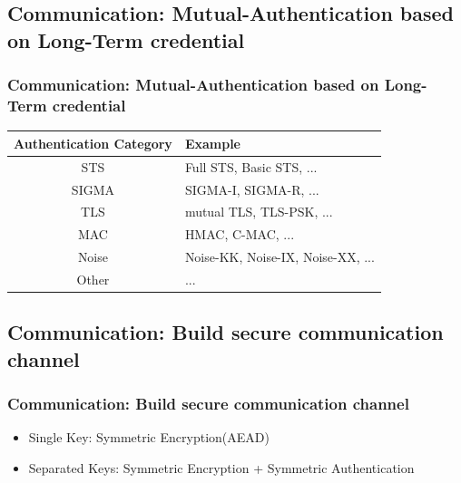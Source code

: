 \documentclass{ctexbeamer}
\begin{document}
\subsection{Communication: Mutual-Authentication based on Long-Term credential}
\begin{frame}
\frametitle{Communication: Mutual-Authentication based on Long-Term credential}


    \begin{table}[width=\textwidth]
        \begin{tabular}{ |c|l| } \hline
            \textbf{Authentication Category} & \textbf{Example} \\ \hline
            STS & Full STS, Basic STS, ... \\ \hline
            SIGMA & SIGMA-I, SIGMA-R, ... \\ \hline
            TLS &  mutual TLS, TLS-PSK, ... \\ \hline
            MAC & HMAC, C-MAC, ... \\ \hline
            Noise & Noise-KK, Noise-IX, Noise-XX, ...  \\ \hline
            Other & ... \\ \hline
        \end{tabular}
    \end{table}

    \end{frame}

\subsection{Communication: Build secure communication channel}
\begin{frame}
\frametitle{Communication: Build secure communication channel}

\begin{itemize}
    \item Single Key: Symmetric Encryption(AEAD)
    \item Separated Keys: Symmetric Encryption + Symmetric Authentication 
\end{itemize}
    \end{frame}
\end{document}

